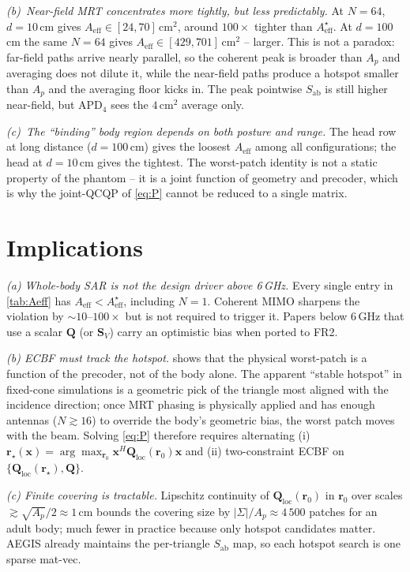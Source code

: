 \documentclass[journal]{IEEEtran}
\newcommand{\rr}{\bm{r}}
\newcommand{\xx}{\bm{x}}
\newcommand{\Sab}{S_{\mathrm{ab}}}
\newcommand{\APD}{\mathrm{APD}}
\newcommand{\Q}{\mathbf{Q}}
\newcommand{\Qloc}{\Q_{\mathrm{loc}}}
\newcommand{\Aeff}{A_{\mathrm{eff}}}
\begin{document}
\emph{(b)~Near-field MRT concentrates more tightly, but less
predictably.} At $N\!=\!64$, $d\!=\!10$\,cm gives
$\Aeff\!\in\![24,70]\,\mathrm{cm}^2$, around $100\times$ tighter than
$\Aeff^\star$. At $d\!=\!100$\,cm the same $N\!=\!64$ gives
$\Aeff\!\in\![429,701]\,\mathrm{cm}^2$ -- larger. This is not a
paradox: far-field paths arrive nearly parallel, so the coherent peak
is broader than $A_p$ and averaging does not dilute it, while the
near-field paths produce a hotspot smaller than $A_p$ and the
averaging floor kicks in. The peak pointwise $\Sab$ is still higher
near-field, but $\APD_4$ sees the $4\,\mathrm{cm}^2$ average only.

\emph{(c)~The ``binding'' body region depends on both posture and
range.} The head row at long distance ($d\!=\!100$\,cm) gives the
loosest $\Aeff$ among all configurations; the head at
$d\!=\!10$\,cm gives the tightest. The worst-patch identity is not
a static property of the phantom -- it is a joint function of
geometry and precoder, which is why the joint-QCQP of
\eqref{eq:P} cannot be reduced to a single matrix.

\section{Implications}\label{sec:implications}

\emph{(a) Whole-body SAR is not the design driver above 6\,GHz.}
Every single entry in \cref{tab:Aeff} has $\Aeff\!<\!\Aeff^\star$,
including $N\!=\!1$. Coherent MIMO sharpens the violation by
$\sim\!10$--$100\times$ but is not required to trigger it.
Papers below 6\,GHz that use a scalar $\Q$ (or $\mathbf S_V$) carry
an optimistic bias when ported to FR2.

\emph{(b) ECBF must track the hotspot.}  shows
that the physical worst-patch is a function of the precoder, not
of the body alone. The apparent ``stable hotspot'' in fixed-cone
simulations is a geometric pick of the triangle most aligned with
the incidence direction; once MRT phasing is physically applied and
has enough antennas ($N\!\gtrsim\!16$) to override the body's
geometric bias, the worst patch moves with the beam. Solving
\eqref{eq:P} therefore requires alternating
(i) $\rr_\star(\xx)=\arg\max_{\rr_0}\xx^H\Qloc(\rr_0)\xx$ and
(ii) two-constraint ECBF on $\{\Qloc(\rr_\star),\Q\}$.

\emph{(c) Finite covering is tractable.} Lipschitz continuity of
$\Qloc(\rr_0)$ in $\rr_0$ over scales $\gtrsim\sqrt{A_p}/2\approx
1$\,cm bounds the covering size by $|\Sigma|/A_p\approx 4\,500$
patches for an adult body; much fewer in practice because only
hotspot candidates matter. AEGIS already maintains the per-triangle
$\Sab$ map, so each hotspot search is one sparse mat-vec.
\end{document}

